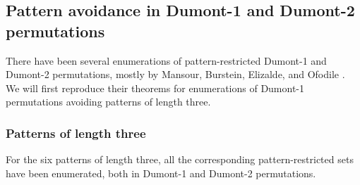 \documentclass[
final
]{dmtcs-episciences}
\newtheorem{theorem}{Theorem}[section]%
\newtheorem{corollary}[theorem]{Corollary}
\theoremstyle{definition}
\newtheorem{example}[theorem]{Example}
\theoremstyle{remark}
\begin{document}
%
%
%
%
%
%
%

\subsection{Pattern avoidance in Dumont-1 and Dumont-2 permutations}

There have been several enumerations of pattern-restricted Dumont-1 and Dumont-2 permutations, mostly by Mansour, Burstein, Elizalde, and Ofodile \cite{Mansour, Burstein_Restricted, Burstein_Dyck, Ofodile}.  We will first reproduce their theorems for enumerations of Dumont-1 permutations avoiding patterns of length three.  


\subsubsection{Patterns of length three}

For the six patterns of length three, all the corresponding pattern-restricted sets have been enumerated, both in Dumont-1 and Dumont-2 permutations.
\end{document}
